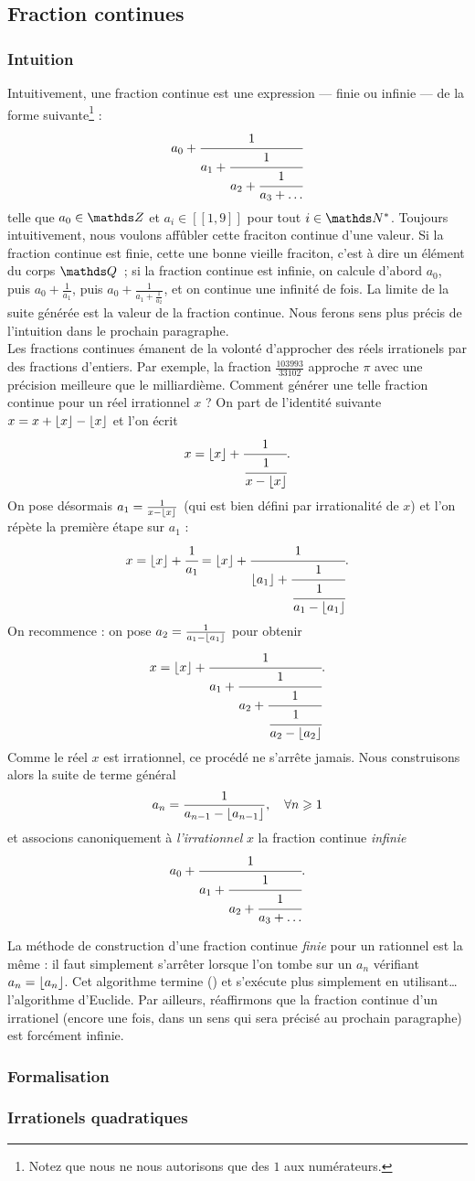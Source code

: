 \subsection{Fraction continues}
\subsubsection{Intuition}

Intuitivement, une fraction continue est une expression — finie ou infinie — de
la forme suivante\footnote{Notez que nous ne nous autorisons que des $1$ aux
numérateurs.} :
\[a_0 + \cfrac{1}{a_1 + \cfrac{1}{a_2 + \cfrac{1}{a_3 + \dots}}}\]
telle que $a_0\in \Z$ et $a_i \in [\![1, 9]\!]$ pour tout $i\in \N^*$.
Toujours intuitivement, nous voulons affûbler cette fraciton continue d'une
valeur. Si la fraction continue est finie, cette une bonne vieille fraciton,
c'est à dire un élément du corps $\Q$~; si la fraction continue est infinie, on
calcule d'abord $a_0$, puis $a_0 + \frac{1}{a_1}$, puis $a_0 + \frac{1}{a_1
+\frac{1}{a_2}}$, et on continue une infinité de fois. La limite de la suite
générée est la \og{} valeur \fg{} de la fraction continue. Nous ferons sens plus
précis de l'intuition dans le prochain paragraphe. \\

Les fractions continues émanent de la volonté d'approcher des réels
irrationels par des fractions d'entiers. Par exemple, la fraction $\frac{103
993}{33 102}$ approche $\pi$ avec une précision meilleure que le milliardième.
Comment générer une telle fraction continue pour un réel irrationnel $x$ ?
On part de l'identité suivante $x = x + \lfloor x\rfloor - \lfloor x\rfloor$ et l'on écrit
\[x = \lfloor x\rfloor + \cfrac{1}{\cfrac{1}{x - \lfloor x\rfloor}}.\]
On pose désormais $a_1 = \frac{1}{x - \lfloor x\rfloor}$ (qui est bien défini par
irrationalité de $x$) et l'on répète la première étape sur $a_1$ :
\[x = \lfloor x\rfloor + \cfrac{1}{a_1} = \lfloor x\rfloor + \cfrac{1}{\lfloor a_1\rfloor +
\cfrac{1}{\cfrac{1}{a_1 - \lfloor a_1\rfloor}}}.\]
On recommence : on pose $a_2 = \frac{1}{a_1 - \lfloor a_1\rfloor}$ pour obtenir
\[x = \lfloor x\rfloor + \cfrac{1}{a_1 + \cfrac{1}{a_2 + \cfrac{1}{\cfrac{1}{a_2 -
\lfloor a_2\rfloor}}}}.\]
Comme le réel $x$ est irrationnel, ce procédé ne s'arrête jamais. Nous
construisons alors la suite de terme général
\[a_n = \frac{1}{a_{n-1} - \lfloor a_{n-1}\rfloor}, \quad \forall n \geqslant 1\]
et associons canoniquement à \emph{l'irrationnel} $x$ la fraction continue
\emph{infinie}
\[a_0 + \cfrac{1}{a_1 + \cfrac{1}{a_2 + \cfrac{1}{a_3 +
\dots}}}.\]

\begin{remarque}
La méthode de construction d'une fraction continue \emph{finie} pour un
rationnel est la même : il faut simplement s'arrêter lorsque l'on tombe sur un
$a_n$ vérifiant $a_n = \lfloor a_n\rfloor$. Cet algorithme termine () et
s'exécute plus simplement en utilisant… l'algorithme d'Euclide. Par ailleurs,
réaffirmons que la fraction continue d'un irrationel (encore une fois, dans un
sens qui sera précisé au prochain paragraphe) est forcément infinie.
\end{remarque}

\subsubsection{Formalisation}

\subsubsection{Irrationels quadratiques}
